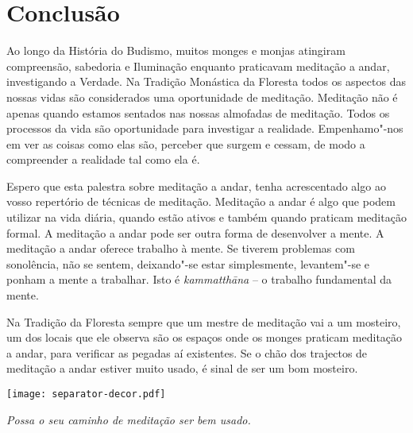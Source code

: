 \chapter{Conclusão}

Ao longo da História do Budismo, muitos monges e monjas atingiram
compreensão, sabedoria e Iluminação enquanto praticavam meditação a
andar, investigando a Verdade. Na Tradição Monástica da Floresta todos
os aspectos das nossas vidas são considerados uma oportunidade de
meditação. Meditação não é apenas quando estamos sentados nas nossas
almofadas de meditação. Todos os processos da vida são oportunidade para
investigar a realidade. Empenhamo"-nos em ver as coisas como elas são,
perceber que surgem e cessam, de modo a compreender a realidade tal como
ela é.

Espero que esta palestra sobre meditação a andar, tenha acrescentado algo
ao vosso repertório de técnicas de meditação. Meditação
a andar é algo que podem utilizar na vida diária, quando estão ativos e
também quando praticam meditação formal. A meditação a andar pode ser
outra forma de desenvolver a mente. A meditação a andar oferece trabalho
à mente. Se tiverem problemas com sonolência, não se sentem, deixando"-se
estar simplesmente, levantem"-se e ponham a mente a trabalhar. Isto é
\emph{kammatthāna} -- o trabalho fundamental da mente.

Na Tradição da Floresta sempre que um mestre de meditação vai a um
mosteiro, um dos locais que ele observa são os espaços onde os monges
praticam meditação a andar, para verificar as pegadas aí existentes. Se
o chão dos trajectos de meditação a andar estiver muito usado, é sinal de
ser um bom mosteiro.

\vspace*{4\baselineskip}

{\centering
  \texttt{[image: separator-decor.pdf]}%
  \par}

\bigskip

{\centering
  \textit{Possa o seu caminho de meditação ser bem usado.}
  \par}

